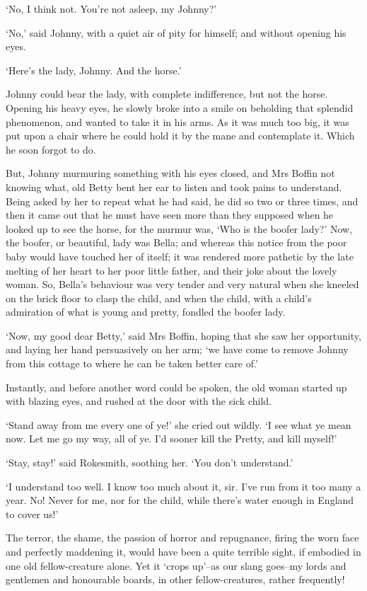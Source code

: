 ‘No, I think not. You’re not asleep, my Johnny?’

‘No,’ said Johnny, with a quiet air of pity for himself; and without
opening his eyes.

‘Here’s the lady, Johnny. And the horse.’

Johnny could bear the lady, with complete indifference, but not the
horse. Opening his heavy eyes, he slowly broke into a smile on beholding
that splendid phenomenon, and wanted to take it in his arms. As it was
much too big, it was put upon a chair where he could hold it by the mane
and contemplate it. Which he soon forgot to do.

But, Johnny murmuring something with his eyes closed, and Mrs Boffin
not knowing what, old Betty bent her ear to listen and took pains to
understand. Being asked by her to repeat what he had said, he did so two
or three times, and then it came out that he must have seen more than
they supposed when he looked up to see the horse, for the murmur was,
‘Who is the boofer lady?’ Now, the boofer, or beautiful, lady was Bella;
and whereas this notice from the poor baby would have touched her of
itself; it was rendered more pathetic by the late melting of her heart
to her poor little father, and their joke about the lovely woman. So,
Bella’s behaviour was very tender and very natural when she kneeled on
the brick floor to clasp the child, and when the child, with a child’s
admiration of what is young and pretty, fondled the boofer lady.

‘Now, my good dear Betty,’ said Mrs Boffin, hoping that she saw her
opportunity, and laying her hand persuasively on her arm; ‘we have come
to remove Johnny from this cottage to where he can be taken better care
of.’

Instantly, and before another word could be spoken, the old woman
started up with blazing eyes, and rushed at the door with the sick
child.

‘Stand away from me every one of ye!’ she cried out wildly. ‘I see what
ye mean now. Let me go my way, all of ye. I’d sooner kill the Pretty,
and kill myself!’

‘Stay, stay!’ said Rokesmith, soothing her. ‘You don’t understand.’

‘I understand too well. I know too much about it, sir. I’ve run from
it too many a year. No! Never for me, nor for the child, while there’s
water enough in England to cover us!’

The terror, the shame, the passion of horror and repugnance, firing the
worn face and perfectly maddening it, would have been a quite terrible
sight, if embodied in one old fellow-creature alone. Yet it ‘crops
up’--as our slang goes--my lords and gentlemen and honourable boards, in
other fellow-creatures, rather frequently!

